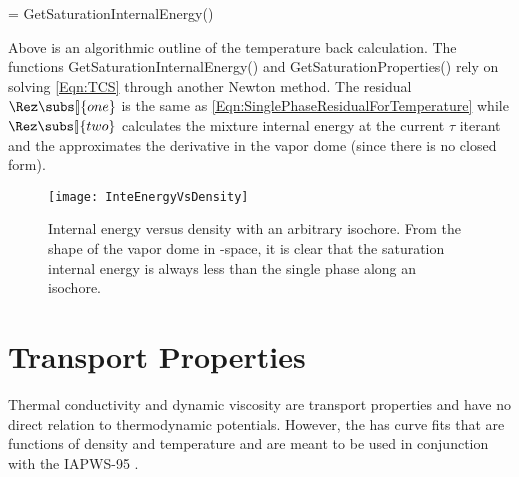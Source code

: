 \begin{BoxedAlgorithm}
    \DontPrintSemicolon
    \SetAlgoLined
    
    \begin{spacing}{1.1}
    
    \vspace{0.5em}
    \isat = \mbox{GetSaturationInternalEnergy}(\delta)\;
    \end{spacing}
\end{BoxedAlgorithm}
Above is an algorithmic outline of the temperature back calculation.  
The functions GetSaturationInternalEnergy() and GetSaturationProperties() rely on solving \cref{Eqn:TCS} 
through another Newton method.
The residual $\Rez\subs[\!]{one}$ is the same as \cref{Eqn:SinglePhaseResidualForTemperature} 
while $\Rez\subs[\!]{two}$ calculates the mixture internal energy at the current $\tau$ iterant 
and the approximates the derivative in the vapor dome (since there is no closed form).

\begin{figure}[H]%
    \begin{center}
        \caption[Internal energy versus density with an arbitrary isochore]{ 
                    Internal energy versus density with an arbitrary isochore.  
                    From the shape of the vapor dome in \Density-\IntEnergy space, it is clear that the saturation internal energy 
                    is always less than the single phase along an isochore.
        }%
        \label{Fig:IntERhoDiagram}%
        \texttt{[image: InteEnergyVsDensity]}%
    \end{center}
\end{figure}

\cleardoublepage
\section{Transport Properties}\label{Section:TransportProps}
Thermal conductivity \ThCond and dynamic viscosity \Viscosity are transport properties and have no direct relation to thermodynamic potentials.
However, the  has curve fits that are functions of density and temperature and are meant to be used in conjunction with the IAPWS-95 \EOS \cite{iapws_release_2008,iapws_release_2011}.


